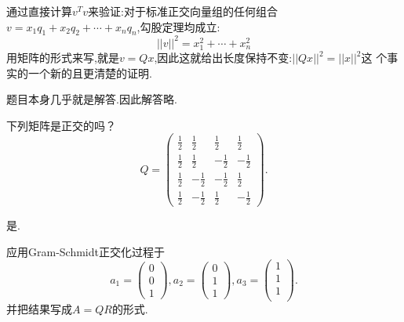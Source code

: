 ﻿\documentclass{book} \usepackage{exsheets} \usepackage{xeCJK}
\begin{document}
\begin{question}
通过直接计算$v^Tv$来验证:对于标准正交向量组的任何组合
$v=x_1q_1+x_2q_2+\cdots+x_nq_n$,勾股定理均成立:
$$
||v||^2=x_1^2+\cdots+x_n^2
$$
用矩阵的形式来写,就是$v=Qx$,因此这就给出长度保持不变:$||Qx||^2=||x||^2$这
个事实的一个新的且更清楚的证明.  
\end{question}
\begin{solution}
  题目本身几乎就是解答.因此解答略.
\end{solution}
\begin{question}
  下列矩阵是正交的吗？
$$
Q=
\begin{pmatrix}
  \frac{1}{2}&\frac{1}{2}&\frac{1}{2}&\frac{1}{2}\\
  \frac{1}{2}&\frac{1}{2}&-\frac{1}{2}&-\frac{1}{2}\\
  \frac{1}{2}&-\frac{1}{2}&-\frac{1}{2}&\frac{1}{2}\\
  \frac{1}{2}&-\frac{1}{2}&\frac{1}{2}&-\frac{1}{2}
\end{pmatrix}.
$$
\end{question}
\begin{solution}
  是.
\end{solution}
\begin{question}
  应用Gram-Schmidt正交化过程于
$$
a_1=
\begin{pmatrix}
  0\\
0\\
1
\end{pmatrix},a_2=
\begin{pmatrix}
  0\\
1\\
1
\end{pmatrix},a_3=
\begin{pmatrix}
  1\\
1\\
1\\
\end{pmatrix}.
$$
并把结果写成$A=QR$的形式.
\end{question}
\end{document}
